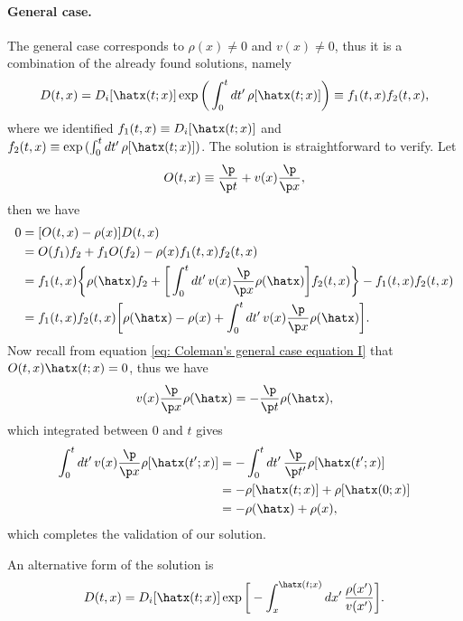 \paragraph{General case.} The general case corresponds to $\rho(x) \neq 0$ and $v(x) \neq 0$, thus it is a combination of the already found solutions, namely 
\begin{equation}
    D(t,x) = D_i[\hatx(t;x)]\exp{\bigg(\int_0^tdt'\,\rho[\hatx(t;x)]\bigg)} \equiv f_1(t,x)f_2(t,x), 
\end{equation}
where we identified $f_1(t,x) \equiv D_i[\hatx(t;x)]$ and $f_2(t,x) \equiv \exp{(\int_0^tdt'\,\rho[\hatx(t;x)])}$. The solution is straightforward to verify. Let
\begin{equation}
    O(t,x) \equiv \frac{\p}{\p t} + v(x)\frac{\p}{\p x},
\end{equation}
then we have
\begin{equation}
    \begin{split}
        0 &= [O(t,x) - \rho(x)]D(t,x) \\
        &= O(f_1)f_2 + f_1O(f_2) - \rho(x)f_1(t,x)f_2(t,x) \\
        &= f_1(t,x)\bigg\{\rho(\hatx)f_2 + \bigg[\int_0^t dt'\,v(x)\frac{\p }{\p x}\rho(\hatx)\bigg]f_2(t,x)\bigg\} - f_1(t,x)f_2(t,x) \\
        &= f_1(t,x)f_2(t,x)\bigg[\rho(\hatx) - \rho(x) + \int_0^t dt'\,v(x)\frac{\p }{\p x}\rho(\hatx)\bigg].
    \end{split}
\end{equation}
Now recall from equation \eqref{eq: Coleman's general case equation I} that $O(t,x)\hatx(t;x) = 0$, thus we have
\begin{equation}
    v(x)\frac{\p}{\p x}\rho(\hatx) = -\frac{\p}{\p t}\rho(\hatx),
\end{equation}
which integrated between 0 and $t$ gives
\begin{equation}
    \begin{split}
        \int_0^t dt'\,v(x)\frac{\p}{\p x}\rho[\hatx(t';x)] &= -\int_0^t dt'\,\frac{\p}{\p t'}\rho[\hatx(t';x)] \\
        &= - \rho[\hatx(t;x)] + \rho[\hatx(0;x)] \\
        &= -\rho(\hatx) + \rho(x),
    \end{split}
\end{equation}
which completes the validation of our solution.
\begin{obs}
    An alternative form of the solution is 
    \begin{equation}
        D(t,x) = D_i[\hatx(t;x)]\exp{\bigg[-\int_x^{\hatx(t;x)}dx'\,\frac{\rho(x')}{v(x')}\bigg]}.
    \end{equation}
\end{obs}
